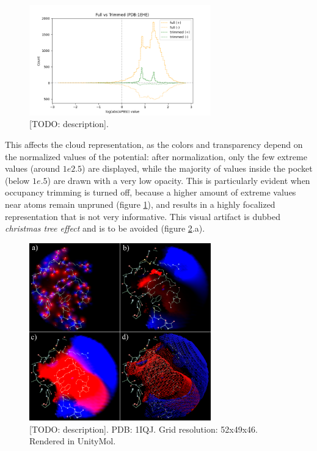     \begin{figure}[H]
      \centering
      \includegraphics[width=0.7\textwidth]{figures/results/logapbs_trimming.png}
      \caption{\label{fig:results/logapbs_trimming} [TODO: description].}
    \end{figure}

    This affects the cloud representation, as the colors and transparency depend on the normalized values of the potential: after normalization, only the few extreme values (around $1e2.5$) are displayed, while the majority of values inside the pocket (below $1e.5$) are drawn with a very low opacity. This is particularly evident when occupancy trimming is turned off, because a higher amount of extreme values near atoms remain unpruned (figure \ref{fig:results/logapbs_trimming}), and results in a highly focalized representation that is not very informative. This visual artifact is dubbed \textit{christmas tree effect} and is to be avoided (figure \ref{fig:results/apbs_christmas}.a).

    \begin{figure}[H]
      \centering
      \includegraphics[width=0.7\textwidth]{figures/results/apbs_christmas.png}
      \caption{\label{fig:results/apbs_christmas} [TODO: description]. PDB: 1IQJ. Grid resolution: 52x49x46. Rendered in UnityMol.}
    \end{figure}


